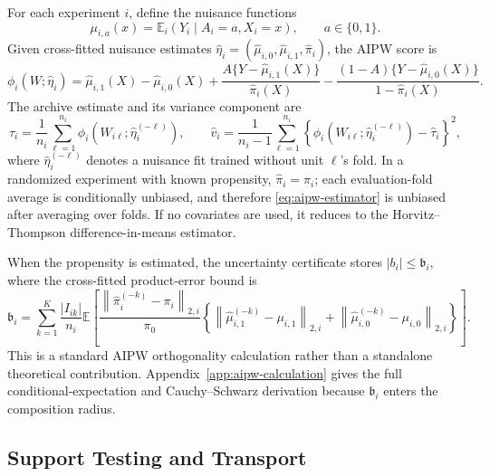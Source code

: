 \documentclass[11pt]{article}
\numberwithin{equation}{section}
\newcommand{\E}{\mathbb E}
\newcommand{\1}{\mathbf 1}
\newcommand{\norm}[1]{\left\lVert #1\right\rVert}
\newcommand{\abs}[1]{\left\lvert #1\right\rvert}
\begin{document}
For each experiment \(i\), define the nuisance functions
\[
  \mu_{i,a}(x)=\E_i(Y_i\mid A_i=a,X_i=x),\qquad a\in\{0,1\}.
\]
Given cross-fitted nuisance estimates \(\widehat\eta_i=(\widehat\mu_{i,0},\widehat\mu_{i,1},\widehat\pi_i)\), the AIPW score is
\begin{equation}
\label{eq:aipw-score}
  \phi_i(W;\widehat\eta_i)
  =
  \widehat\mu_{i,1}(X)-\widehat\mu_{i,0}(X)
  +\frac{A\{Y-\widehat\mu_{i,1}(X)\}}{\widehat\pi_i(X)}
  -\frac{(1-A)\{Y-\widehat\mu_{i,0}(X)\}}{1-\widehat\pi_i(X)}.
\end{equation}
The archive estimate and its variance component are
\begin{equation}
\label{eq:aipw-estimator}
  \widehat\tau_i
  =
  \frac1{n_i}\sum_{\ell=1}^{n_i}\phi_i(W_{i\ell};\widehat\eta_i^{(-\ell)}),
  \qquad
  \widehat v_i
  =
  \frac1{n_i-1}\sum_{\ell=1}^{n_i}
  \left\{
    \phi_i(W_{i\ell};\widehat\eta_i^{(-\ell)})-\widehat\tau_i
  \right\}^2,
\end{equation}
where \(\widehat\eta_i^{(-\ell)}\) denotes a nuisance fit trained without unit \(\ell\)'s fold.  In a randomized experiment with known propensity, \(\widehat\pi_i=\pi_i\); each evaluation-fold average is conditionally unbiased, and therefore \eqref{eq:aipw-estimator} is unbiased after averaging over folds.  If no covariates are used, it reduces to the Horvitz--Thompson difference-in-means estimator.

When the propensity is estimated, the uncertainty certificate stores
\(\abs{b_i}\le\mathfrak b_i\), where the cross-fitted product-error bound is
\begin{equation}
\label{eq:nuisance-remainder}
  \mathfrak b_i
  =
  \sum_{k=1}^K\frac{|I_{ik}|}{n_i}
  \E\!\left[
    \frac{\norm{\widehat\pi_i^{(-k)}-\pi_i}_{2,i}}{\pi_0}
    \left\{
      \norm{\widehat\mu_{i,1}^{(-k)}-\mu_{i,1}}_{2,i}
      +\norm{\widehat\mu_{i,0}^{(-k)}-\mu_{i,0}}_{2,i}
    \right\}
  \right].
\end{equation}
This is a standard AIPW orthogonality calculation rather than a standalone
theoretical contribution.  Appendix~\ref{app:aipw-calculation} gives the full
conditional-expectation and Cauchy--Schwarz derivation because
\(\mathfrak b_i\) enters the composition radius.

\subsection{Support Testing and Transport}
\end{document}
